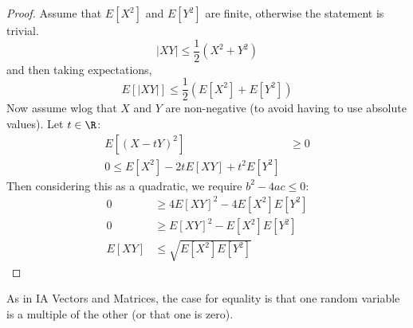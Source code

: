 \documentclass[../Main.tex]{subfiles}
\begin{document}
\begin{proof}
    Assume that $E[X^2]$ and $E[Y^2]$ are finite, otherwise the statement is trivial.
    \begin{equation*}
        |XY| \leq \frac{1}{2} \left(X^2 + Y^2\right)
    \end{equation*}
    and then taking expectations,
    \begin{equation*}
        E[|XY|] \leq \frac{1}{2}\left(E[X^2] + E[Y^2]\right)
    \end{equation*}
    Now assume wlog that $X$ and $Y$ are non-negative (to avoid having to use absolute values). Let $t \in \R$:
    \begin{align*}
        E\left[(X - tY)^2\right] &\geq 0 \\
        0\leq E[X^2] - 2tE[XY] + t^2 E[Y^2]
    \end{align*}
    Then considering this as a quadratic, we require $b^2 - 4ac \leq 0$:
    \begin{align*}
        0 &\geq 4E[XY]^2 - 4E[X^2] E[Y^2] \\
        0 &\geq E[XY]^2 - E[X^2] E[Y^2] \\
        E[XY] &\leq \sqrt{E[X^2]E[Y^2]}
    \end{align*}
\end{proof}
\begin{remark}
    As in IA Vectors and Matrices, the case for equality is that one random variable is a multiple of the other (or that one is zero).
\end{remark}
\end{document}
